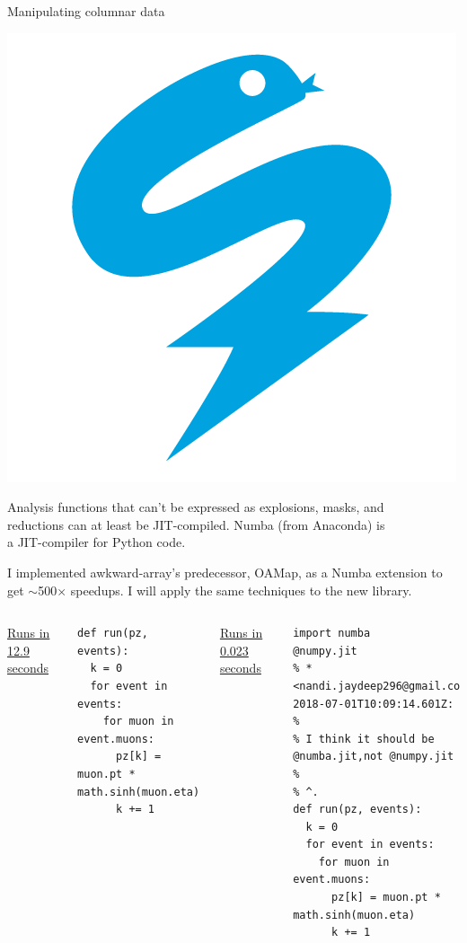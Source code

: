 \documentclass[aspectratio=169]{beamer}
\begin{document}
\begin{frame}[fragile]{Manipulating columnar data}
\vspace{0.5 cm}

\hfill \includegraphics[height=2 cm]{numba-logo.png}

\vspace{-2 cm}

Analysis functions that can't be expressed as explosions, masks, and \\
reductions can at least be JIT-compiled. Numba (from Anaconda) is \\
a JIT-compiler for Python code.

\vspace{0.5 cm}
I implemented awkward-array's predecessor, OAMap, as a Numba extension to get $\sim$500$\times$ speedups. I will apply the same techniques to the new library.

\vspace{0.5 cm}
\begin{columns}[t]
\underline{Runs in 12.9 seconds}

\scriptsize
\vspace{2\baselineskip}
\begin{verbatim}
def run(pz, events):
  k = 0
  for event in events:
    for muon in event.muons:
      pz[k] = muon.pt * math.sinh(muon.eta)
      k += 1
\end{verbatim}

\underline{Runs in 0.023 seconds}

\scriptsize
\begin{verbatim}
import numba
@numpy.jit
% * <nandi.jaydeep296@gmail.com> 2018-07-01T10:09:14.601Z:
% 
% I think it should be @numba.jit,not @numpy.jit
% 
% ^.
def run(pz, events):
  k = 0
  for event in events:
    for muon in event.muons:
      pz[k] = muon.pt * math.sinh(muon.eta)
      k += 1
\end{verbatim}
\end{columns}
\end{frame}
\end{document}
